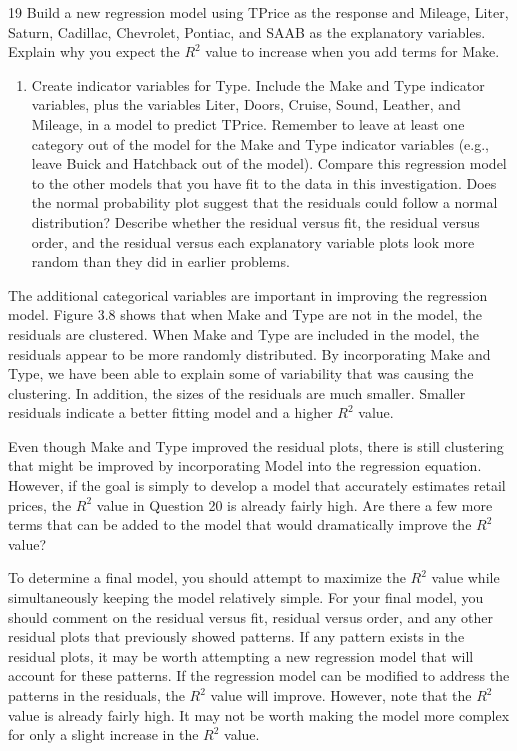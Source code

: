 \documentclass[
]{report}
\providecommand{\tightlist}{%
  \setlength{\itemsep}{0pt}\setlength{\parskip}{0pt}}
\begin{document}
19 Build a new regression model using TPrice as the response and Mileage, Liter, Saturn, Cadillac, Chevrolet, Pontiac, and SAAB as the explanatory variables. Explain why you expect the \(R^2\) value to increase when you add terms for Make.

\begin{enumerate}
\def\labelenumi{\arabic{enumi}.}
\setcounter{enumi}{19}
\tightlist
\item
  Create indicator variables for Type. Include the Make and Type indicator variables, plus the variables Liter, Doors, Cruise, Sound, Leather, and Mileage, in a model to predict TPrice. Remember to leave at least one category out of the model for the Make and Type indicator variables (e.g., leave Buick and Hatchback out of the model). Compare this regression model to the other models that you have fit
  to the data in this investigation. Does the normal probability plot suggest that the residuals could follow a normal distribution? Describe whether the residual versus fit, the residual versus order, and the residual versus each explanatory variable plots look more random than they did in earlier problems.
\end{enumerate}

The additional categorical variables are important in improving the regression model. Figure 3.8 shows that when Make and Type are not in the model, the residuals are clustered. When Make and Type are included in the model, the residuals appear to be more randomly distributed. By incorporating Make and Type, we have been able to explain some of variability that was causing the clustering. In addition, the sizes of the residuals are much smaller. Smaller residuals indicate a better fitting model and a higher \(R^2\) value.

Even though Make and Type improved the residual plots, there is still clustering that might be improved by incorporating Model into the regression equation. However, if the goal is simply to develop a model that accurately estimates retail prices, the \(R^2\) value in Question 20 is already fairly high. Are there a few more terms that can be added to the model that would dramatically improve the \(R^2\) value?

To determine a final model, you should attempt to maximize the \(R^2\) value while simultaneously keeping the model relatively simple. For your final model, you should comment on the residual versus fit, residual versus order, and any other residual plots that previously showed patterns. If any pattern exists in the residual plots, it may be worth attempting a new regression model that will account for these patterns. If the regression model can be modified to address the patterns in the residuals, the \(R^2\) value will improve. However, note that the \(R^2\) value is already fairly high. It may not be worth making the model more complex for only a slight increase in the \(R^2\) value.
\end{document}
